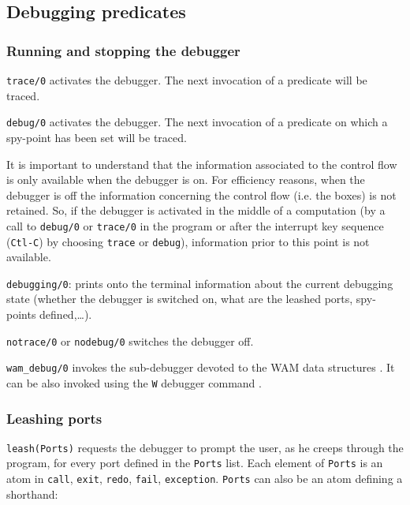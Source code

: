 \subsection{Debugging predicates}

\subsubsection{Running and stopping the debugger}
\label{Running-and-stopping-the-debugger}

\texttt{trace/0} activates the debugger. The next invocation of a predicate
will be traced.

\texttt{debug/0} activates the debugger. The next invocation of a predicate
on which a spy-point has been set will be traced.

It is important to understand that the information associated to the control
flow is only available when the debugger is on. For efficiency reasons, when
the debugger is off the information concerning the control flow (i.e. the
boxes) is not retained. So, if the debugger is activated in the middle of a
computation (by a call to \texttt{debug/0} or \texttt{trace/0} in the
program or after the interrupt key sequence (\texttt{Ctl-C}) by choosing
\texttt{trace} or \texttt{debug}), information prior to this point is not
available.

\texttt{debugging/0}: prints onto the terminal information about the current
debugging state (whether the debugger is switched on, what are the leashed
ports, spy-points defined,\ldots).

\texttt{notrace/0} or \texttt{nodebug/0} switches the debugger off.

\texttt{wam\_debug/0} invokes the sub-debugger devoted to the WAM data
structures . It can be also invoked using the
\texttt{W} debugger command .

\subsubsection{Leashing ports}
\label{Leashing-ports}

\texttt{leash(Ports)} requests the debugger to prompt the user, as
he creeps through the program, for every port defined in the \texttt{Ports}
list. Each element of \texttt{Ports} is an atom in \texttt{call},
\texttt{exit}, \texttt{redo}, \texttt{fail}, \texttt{exception}.
\texttt{Ports} can also be an atom defining a shorthand:

